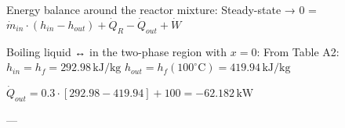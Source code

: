 Energy balance around the reactor mixture:  
Steady-state → 0 = \( \dot{m}_{in} \cdot (h_{in} - h_{out}) + \dot{Q}_R - \dot{Q}_{out} + \dot{W} \)  

Boiling liquid ↔ in the two-phase region with \( x = 0 \):  
From Table A2:  
\( h_{in} = h_f = 292.98 \, \text{kJ/kg} \)  
\( h_{out} = h_f(100^\circ \text{C}) = 419.94 \, \text{kJ/kg} \)  

\( \dot{Q}_{out} = 0.3 \cdot [292.98 - 419.94] + 100 = -62.182 \, \text{kW} \)  

---